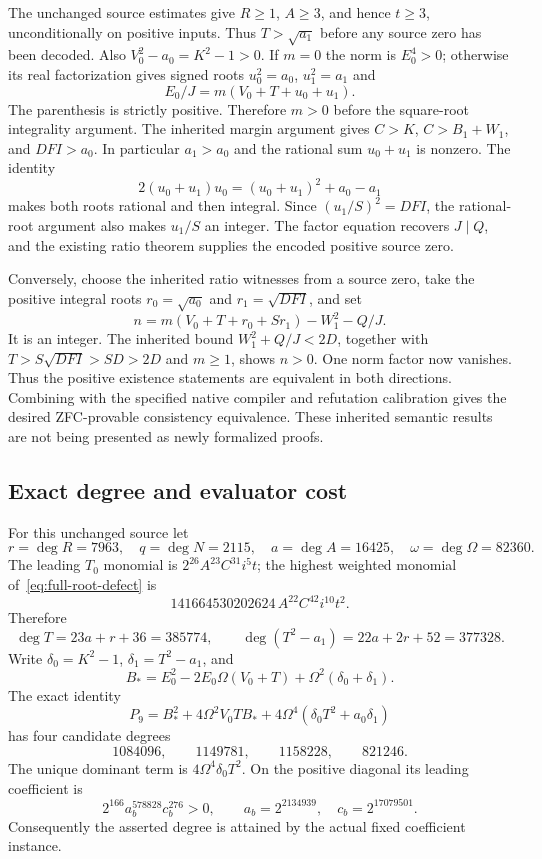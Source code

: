 The unchanged source estimates give $R\ge1$, $A\ge3$, and hence
$t\ge3$, unconditionally on positive inputs. Thus
$T>\sqrt{a_1}$ before any source zero has been decoded. Also
$V_0^2-a_0=K^2-1>0$. If $m=0$ the norm is $E_0^4>0$; otherwise its real
factorization gives signed roots $u_0^2=a_0$, $u_1^2=a_1$ and
\[
 E_0/J=m(V_0+T+u_0+u_1).
\]
The parenthesis is strictly positive. Therefore $m>0$ before the
square-root integrality argument. The inherited margin argument gives
$C>K$, $C>B_1+W_1$, and $DFI>a_0$. In particular $a_1>a_0$ and the
rational sum $u_0+u_1$ is nonzero. The identity
\[
 2(u_0+u_1)u_0=(u_0+u_1)^2+a_0-a_1
\]
makes both roots rational and then integral. Since $(u_1/S)^2=DFI$,
the rational-root argument also makes $u_1/S$ an integer. The factor
equation recovers $J\mid Q$, and the existing ratio theorem supplies the
encoded positive source zero.

Conversely, choose the inherited ratio witnesses from a source zero,
take the positive integral roots $r_0=\sqrt{a_0}$ and
$r_1=\sqrt{DFI}$, and set
\[
 n=m(V_0+T+r_0+Sr_1)-W_1^2-Q/J.
\]
It is an integer. The inherited bound
$W_1^2+Q/J<2D$, together with $T>S\sqrt{DFI}>SD>2D$ and $m\ge1$,
shows $n>0$. One norm factor now vanishes. Thus the positive existence
statements are equivalent in both directions. Combining with the
specified native compiler and refutation calibration gives the desired
ZFC-provable consistency equivalence. These inherited semantic results
are not being presented as newly formalized proofs.

\subsection{Exact degree and evaluator cost}

For this unchanged source let
\[
 r=\deg R=7963,\quad q=\deg N=2115,
 \quad a=\deg A=16425,\quad \omega=\deg\Omega=82360.
\]
The leading $T_0$ monomial is $2^{26}A^{23}C^{31}i^5t$; the highest
weighted monomial of~\eqref{eq:full-root-defect} is
\[
 141664530202624\,A^{22}C^{42}i^{10}t^2.
\]
Therefore
\[
 \deg T=23a+r+36=385774,\qquad
 \deg(T^2-a_1)=22a+2r+52=377328.
\]
Write $\delta_0=K^2-1$, $\delta_1=T^2-a_1$, and
\[
 B_* =E_0^2-2E_0\Omega(V_0+T)
                        +\Omega^2(\delta_0+\delta_1).
\]
The exact identity
\[
 P_9=B_*^2+4\Omega^2V_0TB_*
                  +4\Omega^4(\delta_0T^2+a_0\delta_1)
\]
has four candidate degrees
\[
 1084096,\qquad1149781,\qquad1158228,\qquad821246.
\]
The unique dominant term is $4\Omega^4\delta_0T^2$.
On the positive diagonal its leading coefficient is
\[
 2^{166}a_b^{578828}c_b^{276}>0,
 \qquad a_b=2^{2134939},\quad c_b=2^{17079501}.
\]
Consequently the asserted degree is attained by the actual fixed
coefficient instance.

